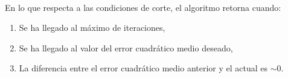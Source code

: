 \documentclass[12pt, twocolumn]{article}
\begin{document}
	\paragraph{} En lo que respecta a las condiciones de corte, el algoritmo retorna cuando:
	
	\begin{enumerate}
		\item Se ha llegado al máximo de iteraciones,
		\item Se ha llegado al valor del error cuadrático medio deseado,
		\item La diferencia entre el error cuadrático medio anterior y el actual es $\sim 0$.
	\end{enumerate}
	
	
	
	
	
	
	
	
	
	
\end{document}
